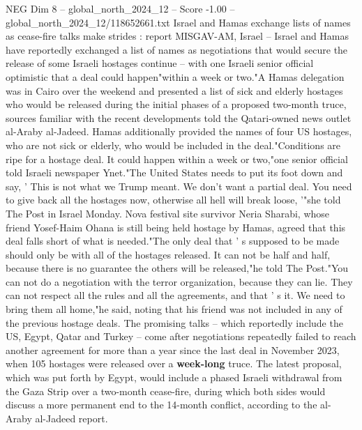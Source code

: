 \begin{textsample}{NEG Dim 8 – global\_north\_2024\_12 – Score -1.00 – global\_north\_2024\_12/118652661.txt}  \label{ex:f8_neg_356}
Israel and Hamas exchange lists of names as cease-fire talks make strides : report MISGAV-AM, Israel -- Israel and Hamas have reportedly exchanged a list of names as negotiations that would secure the release of some Israeli hostages continue -- with one Israeli senior official optimistic that a deal could happen"within a week or two."A Hamas delegation was in Cairo over the weekend and presented a list of sick and elderly hostages who would be released during the initial phases of a proposed two-month truce, sources familiar with the recent developments told the Qatari-owned news outlet al-Araby al-Jadeed.
Hamas additionally provided the names of four US hostages, who are not sick or elderly, who would be included in the deal."Conditions are ripe for a hostage deal.
It could happen within a week or two,"one senior official told Israeli newspaper Ynet."The United States needs to put its foot down and say, ' This is not what we Trump meant.
We don't want a partial deal.
You need to give back all the hostages now, otherwise all hell will break loose, '"she told The Post in Israel Monday.
Nova festival site survivor Neria Sharabi, whose friend Yosef-Haim Ohana is still being held hostage by Hamas, agreed that this deal falls short of what is needed."The only deal that ' s supposed to be made should only be with all of the hostages released.
It can not be half and half, because there is no guarantee the others will be released,"he told The Post."You can not do a negotiation with the terror organization, because they can lie.
They can not respect all the rules and all the agreements, and that ' s it.
We need to bring them all home,"he said, noting that his friend was not included in any of the previous hostage deals.
The promising talks -- which reportedly include the US, Egypt, Qatar and Turkey -- come after negotiations repeatedly failed to reach another agreement for more than a year since the last deal in November 2023, when 105 hostages were released over a \textbf{week-long} truce.
The latest proposal, which was put forth by Egypt, would include a phased Israeli withdrawal from the Gaza Strip over a two-month cease-fire, during which both sides would discuss a more permanent end to the 14-month conflict, according to the al-Araby al-Jadeed report.

\end{textsample}
